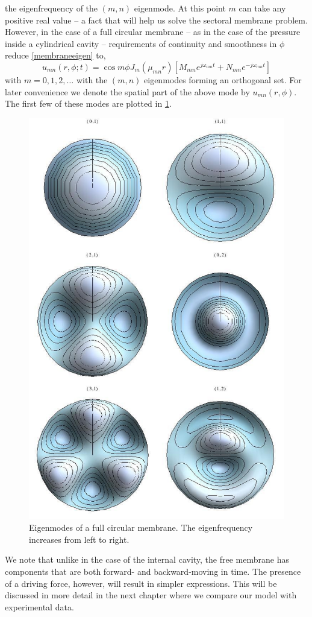 the eigenfrequency of the $(m,n)$ eigenmode. At this point $m$ can take any positive real value -- a fact that will
help us solve the sectoral membrane problem. However, in the case of a full circular membrane -- as in the case
of the pressure inside a cylindrical cavity -- requirements of continuity and smoothness in $\phi$ reduce \eqref{membraneeigen}
to,
\begin{equation}\label{circularmembraneeigen}
 u_{mn}(r,\phi;t)=\cos m\phi J_m(\mu_{mn} r)\left[M_{mn}e^{j\omega_{mn} t}+N_{mn}e^{-j\omega_{mn} t}\right]
\end{equation}
with $m=0,1,2,\ldots$ with the $(m,n)$ eigenmodes forming an orthogonal set. For later convenience we denote the spatial
part of the above mode by $u_{mn}(r,\phi)$. The first few of these modes are plotted in \ref{circularmembraneeigenmodes}.

\begin{figure}[ht!]
 \centering
 \includegraphics[width=.6\linewidth]{Diagrams/CircularMembraneModes/circular_modes_all.png}
 \caption[Circular membrane eigenmodes]{Eigenmodes of a full circular membrane. The eigenfrequency increases from left to right.}
  \label{circularmembraneeigenmodes}
\end{figure}

We note that unlike in the case of the internal cavity, the free membrane has components
that are both forward- and backward-moving in time. The presence of a driving force, however, will result in simpler expressions. This
will be discussed in more detail in the next chapter where we compare our model with experimental data.

